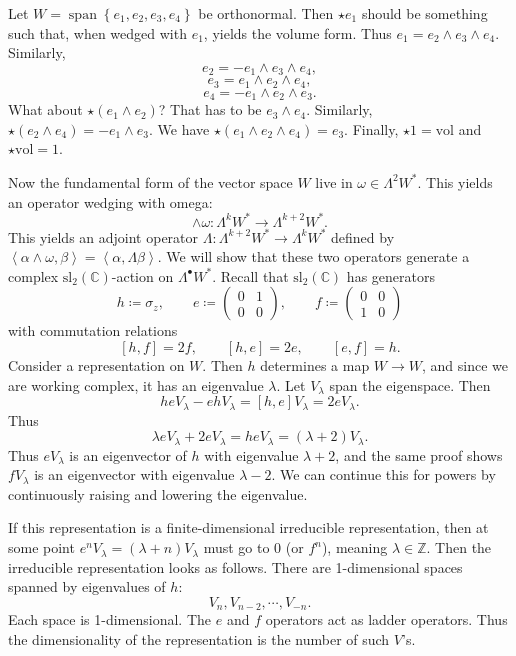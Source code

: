 \begin{example}
	Let $W=\operatorname{span} \left\{ e_1,e_2,e_3,e_4 \right\} $ be orthonormal. Then $\star e_1$ should be something such that, when wedged with $e_1$, yields the volume form. Thus $e_1 = e_2 \wedge e_3 \wedge e_4$. Similarly,
	\[
		e_2 = -e_1 \wedge e_3 \wedge e_4,
	\]
	\[
		e_3 = e_1 \wedge e_2 \wedge e_4,
	\]
	\[
		e_4 = -e_1 \wedge e_2 \wedge e_3
	.\]
	What about $\star (e_1 \wedge e_2)$? That has to be $e_3 \wedge e_4$. Similarly, $\star (e_2 \wedge e_4) = -e_1 \wedge e_3$. We have $\star (e_1 \wedge e_2 \wedge e_4) = e_3$. Finally, $\star 1=\mathrm{vol} $ and $\star \mathrm{vol} =1$.
\end{example}

Now the fundamental form of the vector space $W$ live in $\omega \in \Lambda ^2W^*$. This yields an operator wedging with omega:
\[
	\wedge \omega : \Lambda ^kW^* \to \Lambda ^{k+2} W^*
.\]
This yields an adjoint operator $\Lambda : \Lambda ^{k+2} W^* \to \Lambda ^kW^*$ defined by $\left\langle \alpha \wedge \omega ,\beta  \right\rangle =\left\langle \alpha ,\Lambda \beta  \right\rangle $. We will show that these two operators generate a complex $\mathrm{sl} _2(\mathbb{C} )$-action on $\Lambda ^{\bullet} W^*$. Recall that $\mathrm{sl} _2(\mathbb{C} )$ has generators
\[
	h\coloneqq \sigma _z,\qquad e\coloneqq \begin{pmatrix}
	0 & 1 \\
	0 & 0
	\end{pmatrix},\qquad f\coloneqq \begin{pmatrix}
	0 & 0 \\
	1 & 0
	\end{pmatrix}
\]
with commutation relations
\[
	[h,f]=2f,\qquad [h,e]=2e,\qquad [e,f]=h
.\]
Consider a representation on $W$. Then $h$ determines a map $W\to W$, and since we are working complex, it has an eigenvalue $\lambda $. Let $V_\lambda $ span the eigenspace. Then
\[
	heV_\lambda -ehV_\lambda =[h,e]V_\lambda =2eV_\lambda 
.\]
Thus
\[
	\lambda eV_\lambda  + 2eV_\lambda =heV_\lambda =(\lambda +2)V_\lambda 
.\]
Thus $eV_\lambda $ is an eigenvector of $h$ with eigenvalue $\lambda +2$, and the same proof shows $fV_\lambda $ is an eigenvector with eigenvalue $\lambda -2$. We can continue this for powers by continuously raising and lowering the eigenvalue.

If this representation is a finite-dimensional irreducible representation, then at some point $e^nV_\lambda =(\lambda +n)V_\lambda $ must go to 0 (or $f^n$), meaning $\lambda \in\mathbb{Z} $. Then the irreducible representation looks as follows. There are 1-dimensional spaces spanned by eigenvalues of $h$:
\[
	V_n,V_{n-2} ,\cdots ,V_{-n} 
.\]
Each space is 1-dimensional. The $e$ and $f$ operators act as ladder operators. Thus the dimensionality of the representation is the number of such $V$'s.
